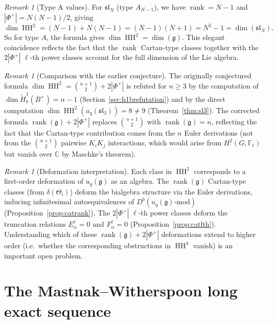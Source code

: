 \documentclass[11pt,letterpaper]{amsart}
\theoremstyle{plain}
\theoremstyle{definition}
\theoremstyle{remark}
\newtheorem{remark}[theorem]{Remark}
\newcommand{\HH}{\operatorname{HH}}
\newcommand{\CC}{\mathbb{C}}
\newcommand{\FF}{\mathbb{F}}
\begin{document}
\begin{remark}[Type A values]
For $\mathfrak{sl}_N$ (type $A_{N-1}$), we have $\operatorname{rank} = N-1$ and $|\Phi^+| = N(N-1)/2$, giving
\[
\dim \HH^2 = (N-1) + N(N-1) = (N-1)(N+1) = N^2 - 1 = \dim(\mathfrak{sl}_N).
\]
So for type $A$, the formula gives $\dim \HH^2 = \dim(\mathfrak{g})$. This elegant coincidence reflects the fact that the $\operatorname{rank}$ Cartan-type classes together with the $2|\Phi^+|$ $\ell$-th power classes account for the full dimension of the Lie algebra.
\end{remark}

\begin{remark}[Comparison with the earlier conjecture]
The originally conjectured formula $\dim \HH^2 = \binom{n+1}{2} + 2|\Phi^+|$ is refuted for $n \geq 3$ by the computation of $\dim \tilde{H}^1_b(B^+) = n - 1$ (Section~\ref{sec:h1brefutation}) and by the direct computation $\dim \HH^2(u_q(\mathfrak{sl}_3)) = 8 \neq 9$ (Theorem~\ref{thm:sl3}). The corrected formula $\operatorname{rank}(\mathfrak{g}) + 2|\Phi^+|$ replaces $\binom{n+1}{2}$ with $\operatorname{rank}(\mathfrak{g}) = n$, reflecting the fact that the Cartan-type contribution comes from the $n$ Euler derivations (not from the $\binom{n+1}{2}$ pairwise $K_i K_j$ interactions, which would arise from $H^2(G, \FF_\ell)$ but vanish over $\CC$ by Maschke's theorem).
\end{remark}

\begin{remark}[Deformation interpretation]
Each class in $\HH^2$ corresponds to a first-order deformation of $u_q(\mathfrak{g})$ as an algebra. The $\operatorname{rank}(\mathfrak{g})$ Cartan-type classes (from $\delta(\Theta_i)$) deform the bialgebra structure via the Euler derivations, inducing infinitesimal autoequivalences of $D^b(u_q(\mathfrak{g})\text{-mod})$ (Proposition~\ref{prop:catrank}). The $2|\Phi^+|$ $\ell$-th power classes deform the truncation relations $E_\alpha^\ell = 0$ and $F_\alpha^\ell = 0$ (Proposition~\ref{prop:catlth}). Understanding which of these $\operatorname{rank}(\mathfrak{g}) + 2|\Phi^+|$ deformations extend to higher order (i.e.\ whether the corresponding obstructions in $\HH^3$ vanish) is an important open problem.
\end{remark}

\section{The Mastnak--Witherspoon long exact sequence}
\label{sec:les}
\end{document}

